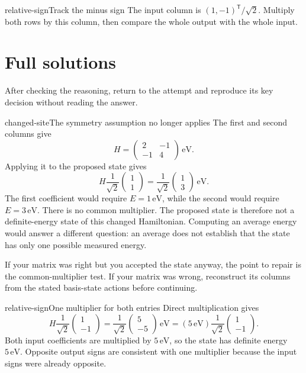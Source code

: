 \documentclass[11pt,a4paper]{article}
\begin{document}
\begin{profhint}{relative-sign}{Track the minus sign}
The input column is $(1,-1)^{\mathsf T}/\sqrt{2}$. Multiply both rows by
this column, then compare the whole output with the whole input.
\end{profhint}

\clearpage
\section{Full solutions}

After checking the reasoning, return to the attempt and reproduce its key
decision without reading the answer.

\begin{profsolution}{changed-site}{The symmetry assumption no longer applies}
The first and second columns give
\[
 H=\begin{pmatrix}2&-1\\-1&4\end{pmatrix}\,\mathrm{eV}.
\]
Applying it to the proposed state gives
\[
 H\frac{1}{\sqrt{2}}\begin{pmatrix}1\\1\end{pmatrix}
 =\frac{1}{\sqrt{2}}\begin{pmatrix}1\\3\end{pmatrix}\,\mathrm{eV}.
\]
The first coefficient would require $E=1\,\mathrm{eV}$, while the second
would require $E=3\,\mathrm{eV}$. There is no common multiplier. The proposed
state is therefore not a definite-energy state of this changed Hamiltonian.
Computing an average energy would answer a different question: an average
does not establish that the state has only one possible measured energy.

If your matrix was right but you accepted the state anyway, the point to
repair is the common-multiplier test. If your matrix was wrong, reconstruct
its columns from the stated basis-state actions before continuing.
\end{profsolution}

\begin{profsolution}{relative-sign}{One multiplier for both entries}
Direct multiplication gives
\[
 H\frac{1}{\sqrt{2}}\begin{pmatrix}1\\-1\end{pmatrix}
 =\frac{1}{\sqrt{2}}\begin{pmatrix}5\\-5\end{pmatrix}\,\mathrm{eV}
 =(5\,\mathrm{eV})\frac{1}{\sqrt{2}}\begin{pmatrix}1\\-1\end{pmatrix}.
\]
Both input coefficients are multiplied by $5\,\mathrm{eV}$, so the state
has definite energy $5\,\mathrm{eV}$. Opposite output signs are consistent
with one multiplier because the input signs were already opposite.
\end{profsolution}
\end{document}
